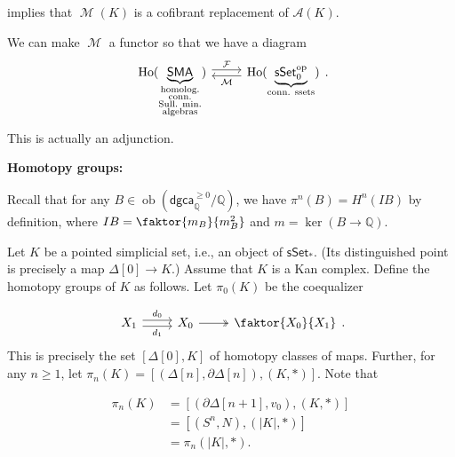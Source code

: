 \documentclass[10pt,letterpaper,cm]{nupset}
\theoremstyle{definition}
\theoremstyle{theorem}
\theoremstyle{remark}
\newcommand{\A}{\mathcal A}
\newcommand{\F}{\mathcal F}
\newcommand{\Q}{\mathbb Q}
\newcommand{\1}{\mathbb{1}}
\newcommand{\dgca}{\mathsf{dgca}}
\newcommand{\0}{\vec 0}
\DeclareMathOperator{\ho}{Ho}
\DeclareMathOperator{\M}{\mathcal{M}}
\DeclareMathOperator{\ob}{ob}
\DeclareMathOperator{\op}{op}
\begin{document}
 implies that $\M(K)$ is a cofibrant replacement of $\A(K)$.

\medskip

We can make $\M$ a functor so that we have a diagram
\[
\begin{tikzcd}
	{\ho(\underbrace{\mathsf{SMA}}_{\substack{\text{homolog.} \\ \text{conn.} \\ \text{Sull. min.} \\ \text{algebras}}})} & {\ho(\underbrace{\mathsf{sSet}_0^{\op}}_{\text{conn. ssets}})}
	\arrow["\F", shift left=1, from=1-1, to=1-2]
	\arrow["\M", shift left=1, from=1-2, to=1-1]
\end{tikzcd}
.\] This is actually an adjunction.

\bigskip

\textbf{Homotopy groups:}

\medskip

Recall that for any $B \in \ob(\dgca_{\Q}^{\geq 0}/\Q)$, we have
$
\pi^n(B) = H^n(I{B})
$
 by definition, where $I{B} = \faktor{m_B}{m_B^2}$ and $m = \ker(B \to \Q)$. 

\medskip


Let $K$ be a pointed simplicial set, i.e., an object of $\mathsf{sSet}_{\ast}$. (Its distinguished point is precisely a map $\Delta\left[0\right] \to K$.) Assume that $K$ is a Kan complex. Define the homotopy groups of $K$ as follows. Let $\pi_0(K)$ be the coequalizer

\[
\begin{tikzcd}
	{X_1} & {X_0} & {\faktor{X_0}{X_1}}
	\arrow["{d_0}", shift left=1, from=1-1, to=1-2]
	\arrow["{d_1}"', shift right=1, from=1-1, to=1-2]
	\arrow[two heads, from=1-2, to=1-3]
\end{tikzcd}.
\]
This is precisely the set $\left[\Delta\left[0\right], K\right]$ of homotopy classes of maps. Further, for any $n \geq 1$, let \linebreak $\pi_n(K) = \left[\left(\Delta\left[n\right], \partial{\Delta\left[n\right]}\right), \left(K, \ast\right)\right]$. Note that

\begin{align*}
\pi_n(K) & = \left[\left(\partial{\Delta\left[n+1\right]}, v_0\right), \left(K, \ast\right)\right]
\\ & = \left[\left(S^n, N\right), \left(\left\lvert{K}\right\rvert, \ast\right)\right]
\\ & = \pi_n(\left\lvert{K}\right\rvert, \ast)
.\end{align*}
\end{document}
